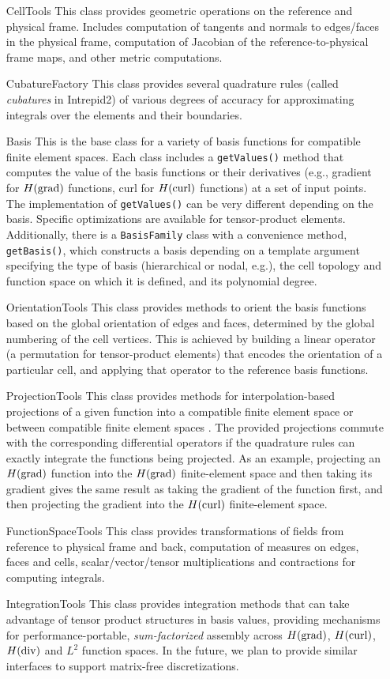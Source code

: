 \begin{itemize}
\item[CellTools] This class provides geometric operations on the reference and physical frame. Includes computation of tangents and normals to edges/faces in the physical frame, computation of Jacobian of the reference-to-physical frame maps, and other metric computations. 
\item[CubatureFactory] This class provides several quadrature rules (called \emph{cubatures} in Intrepid2) of various degrees of accuracy for approximating integrals over the elements and their boundaries.
\item[Basis] This is the base class for a variety of basis functions for compatible finite element spaces. Each class includes a \texttt{getValues()} method that computes the value of the basis functions or their derivatives (e.g., gradient for $H({\rm grad})$ functions, curl for $H({\rm curl})$ functions) at a set of input points. The implementation of \texttt{getValues()} can be very different depending on the basis. Specific optimizations are available for tensor-product elements.  Additionally, there is a \texttt{BasisFamily} class with a convenience method, \texttt{getBasis()}, which constructs a basis depending on a template argument specifying the type of basis (hierarchical or nodal, e.g.), the cell topology and function space on which it is defined, and its polynomial degree.
\item[OrientationTools] This class provides methods to orient the basis functions based on the global orientation of edges and faces, determined by the global numbering of the cell vertices. This is achieved by building a linear operator (a permutation for tensor-product elements) that encodes the orientation of a particular cell, and applying that operator to the reference basis functions.
\item[ProjectionTools] This class provides methods for interpolation-based projections of a given function into a compatible finite element space or between compatible finite element spaces \cite{demkowicz2007}.  The provided projections commute with the corresponding differential operators if the quadrature rules can exactly integrate the functions being projected. As an example, projecting an $H({\rm grad})$ function into the $H({\rm grad})$ finite-element space and then taking its gradient gives the same result as taking the gradient of the function first, and then projecting the gradient into the $H({\rm curl})$ finite-element space.
\item[FunctionSpaceTools] This class provides transformations of fields from reference to physical frame and back, computation of measures on edges, faces and cells, scalar/vector/tensor multiplications and contractions for computing integrals.
\item[IntegrationTools] This class provides integration methods that can take advantage of tensor product structures in basis values, providing mechanisms for performance-portable, \emph{sum-factorized} assembly across $H({\rm grad})$, $H({\rm curl})$, $H({\rm div})$ and $L^2$ function spaces.  In the future, we plan to provide similar interfaces to support matrix-free discretizations.
\end{itemize}
